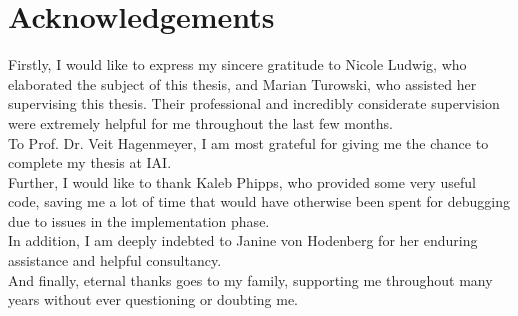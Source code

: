 \chapter*{Acknowledgements}

Firstly, I would like to express my sincere gratitude to Nicole Ludwig, who elaborated the subject of this thesis, and Marian Turowski, who assisted her supervising this thesis. Their professional and incredibly considerate supervision were extremely helpful for me throughout the last few months.\\

To Prof. Dr. Veit Hagenmeyer, I am most grateful for giving me the chance to complete my thesis at IAI.\\

Further, I would like to thank Kaleb Phipps, who provided some very useful code, saving me a lot of time that would have otherwise been spent for debugging due to issues in the implementation phase.\\

In addition, I am deeply indebted to Janine von Hodenberg for her enduring assistance and helpful consultancy.\\

And finally, eternal thanks goes to my family, supporting me throughout many years without ever questioning or doubting me.\\


